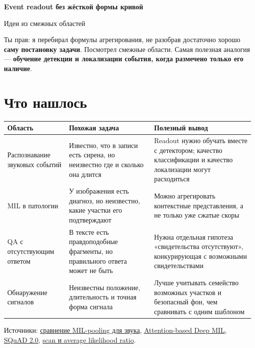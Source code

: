 \documentclass[a4paper,11pt]{article}
\begin{document}
\begin{center}
  {\LARGE\bfseries Event readout без жёсткой формы кривой}\par
  \vspace{5pt}
  {\large Идеи из смежных областей}
\end{center}

Ты прав: я перебирал формулы агрегирования, не разобрав достаточно хорошо
\textbf{саму постановку задачи}. Посмотрел смежные области. Самая полезная
аналогия --- \textbf{обучение детекции и локализации события, когда размечено
только его наличие}.

\section*{Что нашлось}

{\small
\renewcommand{\arraystretch}{1.2}
\begin{tabularx}{\linewidth}{@{}>{\raggedright\arraybackslash}p{.22\linewidth}
  >{\raggedright\arraybackslash}p{.31\linewidth}
  >{\raggedright\arraybackslash}X@{}}
\toprule
\textbf{Область} & \textbf{Похожая задача} & \textbf{Полезный вывод}\\
\midrule
Распознавание звуковых событий &
Известно, что в записи есть сирена, но неизвестно где и сколько она длится &
Readout нужно обучать вместе с детектором; качество классификации и качество
локализации могут расходиться\\
MIL в патологии &
У изображения есть диагноз, но неизвестно, какие участки его подтверждают &
Можно агрегировать контекстные представления, а не только уже сжатые скоры\\
QA с отсутствующим ответом &
В тексте есть правдоподобные фрагменты, но правильного ответа может не быть &
Нужна отдельная гипотеза «свидетельства отсутствуют», конкурирующая с возможными
свидетельствами\\
Обнаружение сигналов &
Неизвестны положение, длительность и точная форма сигнала &
Лучше учитывать семейство возможных участков и безопасный фон, чем сравнивать
с одним шаблоном\\
\bottomrule
\end{tabularx}
}

Источники:
\href{https://arxiv.org/html/1810.09050v3}{сравнение MIL-pooling для звука},
\href{https://proceedings.mlr.press/v80/ilse18a.html}{Attention-based Deep MIL},
\href{https://arxiv.org/abs/1806.03822}{SQuAD 2.0},
\href{https://arxiv.org/abs/1107.4344}{scan и average likelihood ratio}.
\end{document}
